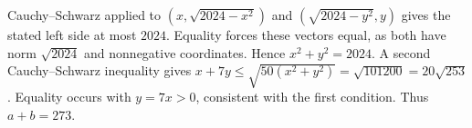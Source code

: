 Cauchy--Schwarz applied to $(x,\sqrt{2024-x^2})$ and $(\sqrt{2024-y^2},y)$ gives the stated left side at most $2024$. Equality forces these vectors equal, as both have norm $\sqrt{2024}$ and nonnegative coordinates. Hence $x^2+y^2=2024$. A second Cauchy--Schwarz inequality gives $x+7y\le\sqrt{50(x^2+y^2)}=\sqrt{101200}=20\sqrt{253}$. Equality occurs with $y=7x>0$, consistent with the first condition. Thus $\boxed{a+b=273}$.
